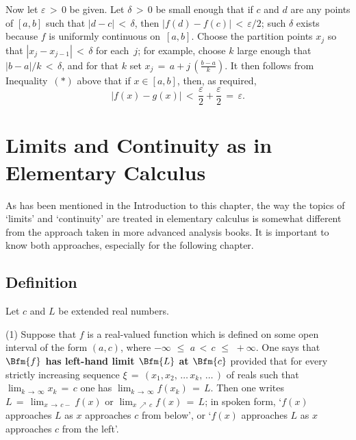 \V

        Now let ${\varepsilon}\,>\,0$ be given. Let ${\delta}\,>\,0$ be small enough that if $c$ and $d$ are any points of $[a,b]$ such that
    $|d-c|\,<\,{\delta}$, then $|f(d)-f(c)|\,<\,{\varepsilon}/2$; such ${\delta}$ exists because $f$ is uniformly continuous on~$[a,b]$.
    Choose the partition points $x_{j}$ so that $|x_{j}-x_{j-1}|\,<\,{\delta}$ for each~$j$;
    for example, choose $k$ large enough that $|b-a|/k\,<\,{\delta}$, and for that $k$ set ${\displaystyle x_{j} \,=\, a + j\,\left(\frac{b-a}{k}\right)}$.
    It then follows from Inequality~$({\ast})$  above that if $x{\in}[a,b]$, then, as required,
        \begin{displaymath}
        |f(x)-g(x)|\,<\,\frac{{\varepsilon}}{2} + \frac{{\varepsilon}}{2} \,=\, {\varepsilon}.
        \end{displaymath}

\VV

                 \section{{\bf Limits and Continuity as in Elementary Calculus}}
                \label{SectD50}

\VV

        As has been mentioned in the Introduction to this chapter, the way the topics of `limits' and `continuity'
    are treated in elementary calculus is somewhat different from the approach taken in more advanced analysis books.
    It is important to know both approaches, especially for the following chapter.

\VV


            \subsection{\small{\bf Definition}}
            \label{DefD50.10}

\V

        Let $c$ and $L$ be extended real numbers.

\V

        (1) Suppose that $f$ is a real-valued function which is defined on some open interval of the form $(a,c)$, where $-{\infty}\,\,{\leq}\,\,a\,<\,c\,\,{\leq}\,\,+{\infty}$.
    One says that {\bf $\Bfm{f}$ has left-hand limit $\Bfm{L}$ at $\Bfm{c}$} provided that for every strictly increasing sequence
    ${\xi} \,=\, (x_{1}, x_{2},\,{\ldots}\,x_{k},\,{\ldots}\,)$ of reals such that $\lim_{k \,{\rightarrow}\, {\infty}} x_{k} \,=\, c$
    one has $\lim_{k \,{\rightarrow}\, {\infty}} f(x_{k}) \,=\, L$. Then one writes $L \,=\, \lim_{x \,{\rightarrow}\, c-} f(x)$
    or $\lim_{x \,{\nearrow}\, c} f(x) \,=\, L$; in spoken form, `$f(x)$ approaches $L$ as $x$ approaches $c$ from below',
    or `$f(x)$ approaches $L$ as $x$ approaches $c$ from the left'.

